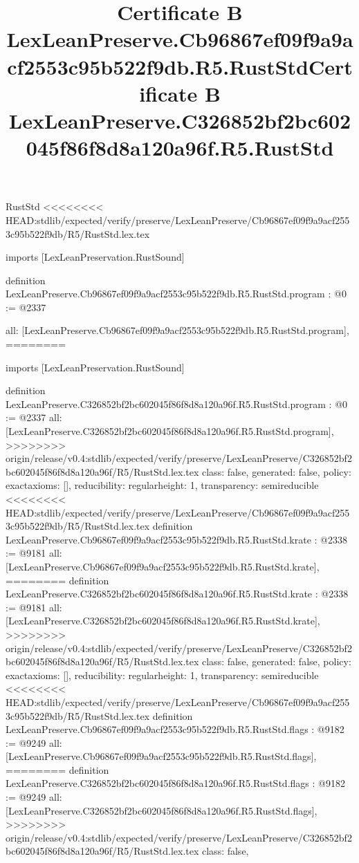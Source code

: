 \begin{lexlean}{RustStd}
<<<<<<<< HEAD:stdlib/expected/verify/preserve/LexLeanPreserve/Cb96867ef09f9a9acf2553c95b522f9db/R5/RustStd.lex.tex
\title{Certificate B LexLeanPreserve.Cb96867ef09f9a9acf2553c95b522f9db.R5.RustStd}
\begin{coremodule}
imports [LexLeanPreservation.RustSound]

definition LexLeanPreserve.Cb96867ef09f9a9acf2553c95b522f9db.R5.RustStd.program : @0 := @2337 {
  all: [LexLeanPreserve.Cb96867ef09f9a9acf2553c95b522f9db.R5.RustStd.program],
========
\title{Certificate B LexLeanPreserve.C326852bf2bc602045f86f8d8a120a96f.R5.RustStd}
\begin{coremodule}
imports [LexLeanPreservation.RustSound]

definition LexLeanPreserve.C326852bf2bc602045f86f8d8a120a96f.R5.RustStd.program : @0 := @2337 {
  all: [LexLeanPreserve.C326852bf2bc602045f86f8d8a120a96f.R5.RustStd.program],
>>>>>>>> origin/release/v0.4:stdlib/expected/verify/preserve/LexLeanPreserve/C326852bf2bc602045f86f8d8a120a96f/R5/RustStd.lex.tex
  class: false,
  generated: false,
  policy: exact{axioms: []},
  reducibility: regular{height: 1},
  transparency: semireducible
}
<<<<<<<< HEAD:stdlib/expected/verify/preserve/LexLeanPreserve/Cb96867ef09f9a9acf2553c95b522f9db/R5/RustStd.lex.tex
definition LexLeanPreserve.Cb96867ef09f9a9acf2553c95b522f9db.R5.RustStd.krate : @2338 := @9181 {
  all: [LexLeanPreserve.Cb96867ef09f9a9acf2553c95b522f9db.R5.RustStd.krate],
========
definition LexLeanPreserve.C326852bf2bc602045f86f8d8a120a96f.R5.RustStd.krate : @2338 := @9181 {
  all: [LexLeanPreserve.C326852bf2bc602045f86f8d8a120a96f.R5.RustStd.krate],
>>>>>>>> origin/release/v0.4:stdlib/expected/verify/preserve/LexLeanPreserve/C326852bf2bc602045f86f8d8a120a96f/R5/RustStd.lex.tex
  class: false,
  generated: false,
  policy: exact{axioms: []},
  reducibility: regular{height: 1},
  transparency: semireducible
}
<<<<<<<< HEAD:stdlib/expected/verify/preserve/LexLeanPreserve/Cb96867ef09f9a9acf2553c95b522f9db/R5/RustStd.lex.tex
definition LexLeanPreserve.Cb96867ef09f9a9acf2553c95b522f9db.R5.RustStd.flags : @9182 := @9249 {
  all: [LexLeanPreserve.Cb96867ef09f9a9acf2553c95b522f9db.R5.RustStd.flags],
========
definition LexLeanPreserve.C326852bf2bc602045f86f8d8a120a96f.R5.RustStd.flags : @9182 := @9249 {
  all: [LexLeanPreserve.C326852bf2bc602045f86f8d8a120a96f.R5.RustStd.flags],
>>>>>>>> origin/release/v0.4:stdlib/expected/verify/preserve/LexLeanPreserve/C326852bf2bc602045f86f8d8a120a96f/R5/RustStd.lex.tex
  class: false,
}}}
\end{coremodule}}
\end{coremodule}
\end{lexlean}
